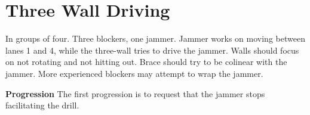 \section{Three Wall Driving}
\label{drill:three_wall:driving_facilitated}

In groups of four. 
Three blockers, one jammer.
Jammer works on moving between lanes 1 and 4, while the three-wall tries to drive the jammer.
Walls should focus on not rotating and not hitting out.  
Brace should try to be colinear with the jammer. 
More experienced blockers may attempt to wrap the jammer.

{\bf Progression}
The first progression is to request that the jammer stops facilitating the drill. 
